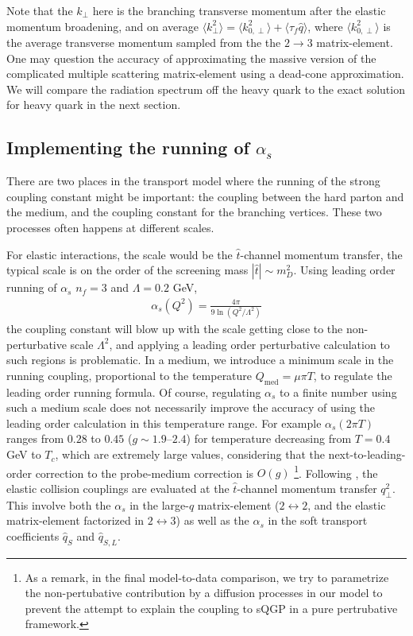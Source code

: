 Note that the $k_\perp$ here is the branching transverse momentum after the elastic momentum broadening, and on average $\langle k_\perp^2 \rangle = \langle k_{0,\perp}^2 \rangle + \langle\tau_f\hat{q}\rangle$, where $\langle k_{0,\perp}^2 \rangle$ is the average transverse momentum sampled from the the $2\rightarrow 3$ matrix-element.
One may question the accuracy of approximating the massive version of the complicated multiple scattering matrix-element using a dead-cone approximation.
We will compare the radiation spectrum off the heavy quark to the exact solution for heavy quark in the next section.

\subsection{Implementing the running of $\alpha_s$}
There are two places in the transport model where the running of the strong coupling constant might be important:
the coupling between the hard parton and the medium, and the coupling constant for the branching vertices.
These two processes often happens at different scales.

For elastic interactions, the scale would be the $\hat{t}$-channel momentum transfer, the typical scale is on the order of the screening mass $|\hat{t}| \sim m_D^2$.  
Using leading order running of $\alpha_s$ $n_f = 3$ and $\Lambda = 0.2$ GeV, 
\begin{eqnarray}
\alpha_s(Q^2) = \frac{4\pi}{9\ln\left(Q^2/\Lambda^2\right)}
\end{eqnarray}
the coupling constant will blow up with the scale getting close to the non-perturbative scale $\Lambda^2$, and applying a leading order perturbative calculation to such regions is problematic. 
In a medium, we introduce a minimum scale in the running coupling, proportional to the temperature $Q_{\textrm{med}} = \mu \pi T$, to regulate the leading order running formula.
Of course, regulating $\alpha_s$ to a finite number using such a medium scale does not necessarily improve the accuracy of using the leading order  calculation in this temperature range. 
For example $\alpha_s(2\pi T)$ ranges from $0.28$ to $0.45$ ($g \sim 1.9$--$2.4$) for temperature decreasing from $T=0.4$ GeV to $T_c$, which are extremely large values, considering that the next-to-leading-order correction to the probe-medium correction is $O(g)$  
\footnote{As a remark, in the final model-to-data comparison, we try to parametrize the non-pertubative contribution by a diffusion processes in our model to prevent the attempt to explain the coupling to sQGP in a pure pertrubative framework.}.
Following \cite{Arnold:2008zu}, the elastic collision couplings are evaluated at the $\hat{t}$-channel momentum transfer $q_\perp^2$.
This involve both the $\alpha_s$ in the large-$q$ matrix-element ($2\leftrightarrow 2$, and the elastic matrix-element factorized in $2\leftrightarrow 3$) as well as the $\alpha_s$ in the soft transport coefficients $\hat{q}_S$ and $\hat{q}_{S, L}$.

